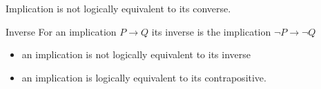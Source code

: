 \documentclass[../MATH-2000-Notes.tex]{subfiles}
\begin{document}
\begin{Note}
    Implication is not logically equivalent to its converse.
\end{Note}
\begin{Definition}
    {Inverse}
    For an implication \(P \rightarrow Q\) its inverse is the implication \(\neg P \rightarrow \neg Q\)
\end{Definition}
\begin{Note}
    \begin{itemize}
        \item an implication  is not logically equivalent to its inverse
        \item an implication is logically equivalent to its contrapositive.
    \end{itemize}
\end{Note}
\end{document}
